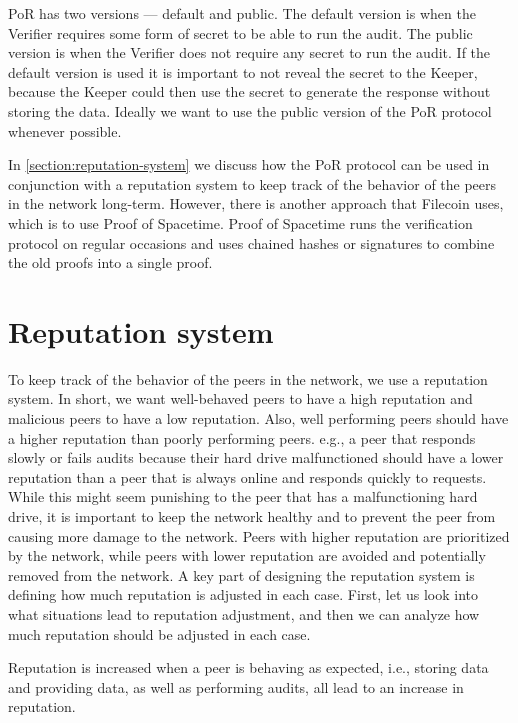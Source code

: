 PoR has two versions --- default and public.
The default version is when the Verifier requires some form of secret to be able to run the audit.
The public version is when the Verifier does not require any secret to run the audit.
If the default version is used it is important to not reveal the secret to the Keeper,
because the Keeper could then use the secret to generate the response without storing the data.
Ideally we want to use the public version of the PoR protocol whenever possible.

In \autoref{section:reputation-system} we discuss how the PoR protocol can be used in conjunction with
a reputation system to keep track of the behavior of the peers in the network long-term.
However, there is another approach that Filecoin \cite{filecoin} uses, which is to use 
Proof of Spacetime.
Proof of Spacetime runs the verification protocol on regular occasions and uses chained hashes or signatures
to combine the old proofs into a single proof.

\section{Reputation system}
\label{section:reputation-system}

To keep track of the behavior of the peers in the network, we use a reputation system.
In short, we want well-behaved peers to have a high reputation and malicious peers to have a low reputation.
Also, well performing peers should have a higher reputation than poorly performing peers.
e.g., a peer that responds slowly or fails audits because their hard drive malfunctioned should
have a lower reputation than a peer that is always online and responds quickly to requests.
While this might seem punishing to the peer that has a malfunctioning hard drive,
it is important to keep the network healthy and to prevent the peer from causing more damage to the network.
Peers with higher reputation are prioritized by the network, while peers with lower reputation are
avoided and potentially removed from the network.
A key part of designing the reputation system is defining how much reputation is adjusted in each case.
First, let us look into what situations lead to reputation adjustment, and then we can
analyze how much reputation should be adjusted in each case.

Reputation is increased when a peer is behaving as expected,
i.e., storing data and providing data, as well as performing audits, all lead to an increase in reputation.

